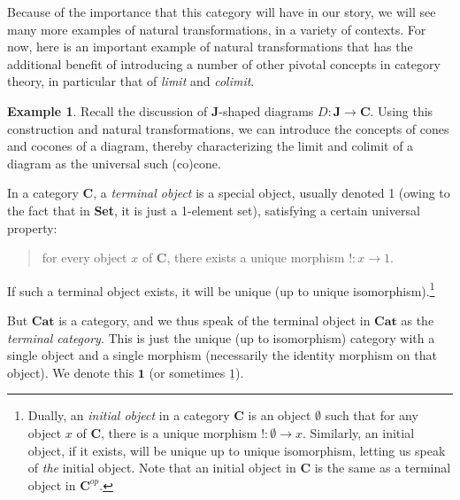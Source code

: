 \documentclass[a4paper]{book}
\theoremstyle{definition}
\newtheorem{example}{Example}[section]
\theoremstyle{definition}
\theoremstyle{definition}
\theoremstyle{theorem}
\theoremstyle{definition}
\begin{document}
Because of the importance that this category will have in our story, we will see many more examples of natural transformations, in a variety of contexts. For now, here is an important example of natural transformations that has the additional benefit of introducing a number of other pivotal concepts in category theory, in particular that of \textit{limit} and \textit{colimit}.    
\begin{example}
	Recall the discussion of \textbf{J}-shaped diagrams $D: \textbf{J} \rightarrow \textbf{C}$. Using this construction and natural transformations, we can introduce the concepts of cones and cocones of a diagram, thereby characterizing the limit and colimit of a diagram as the universal such (co)cone. \par 
	In a category \textbf{C}, a \textit{terminal object} is a special object, usually denoted 1 (owing to the fact that in \textbf{Set}, it is just a 1-element set), satisfying a certain universal property: 
	\begin{quote}
		for every object $x$ of $\textbf{C}$, there exists a unique morphism $!: x \rightarrow 1$. 
	\end{quote} 
If such a terminal object exists, it will be unique (up to unique isomorphism).\footnote{Dually, an \textit{initial object} in a category $\textbf{C}$ is an object $\emptyset$ such that for any object $x$ of $\textbf{C}$, there is a unique morphism $!: \emptyset \rightarrow x$. Similarly, an initial object, if it exists, will be unique up to unique isomorphism, letting us speak of \textit{the} initial object. Note that an initial object in $\textbf{C}$ is the same as a terminal object in $\textbf{C}^{op}$.} \par 
But $\textbf{Cat}$ is a category, and we thus speak of the terminal object in $\textbf{Cat}$ as the \textit{terminal category}.  This is just the unique (up to isomorphism) category with a single object and a single morphism (necessarily the identity morphism on that object). We denote this $\textbf{1}$ (or sometimes $\underline{1}$). \par   

\end{example}
\end{document}
